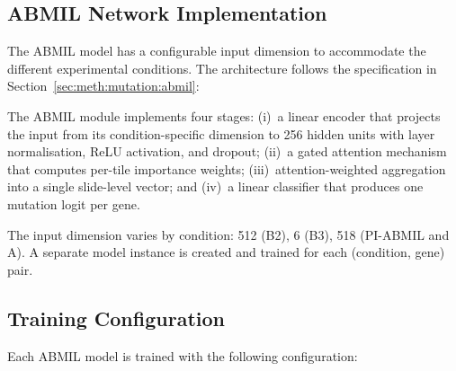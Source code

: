 \subsection{ABMIL Network Implementation}
\label{sec:impl:mutation:network}

The ABMIL model has a configurable input dimension to accommodate the different experimental conditions.
The architecture follows the specification in Section~\ref{sec:meth:mutation:abmil}:

The ABMIL module implements four stages: (i)~a linear encoder that
projects the input from its condition-specific dimension to 256
hidden units with layer normalisation, ReLU activation, and dropout;
(ii)~a gated attention mechanism that computes per-tile importance
weights; (iii)~attention-weighted aggregation into a single
slide-level vector; and (iv)~a linear classifier that produces one
mutation logit per gene.

The input dimension varies by condition: 512 (B2), 6 (B3), 518 (PI-ABMIL and A).
A separate model instance is created and trained for each (condition, gene) pair.

\subsection{Training Configuration}
\label{sec:impl:mutation:training}

Each ABMIL model is trained with the following configuration:

